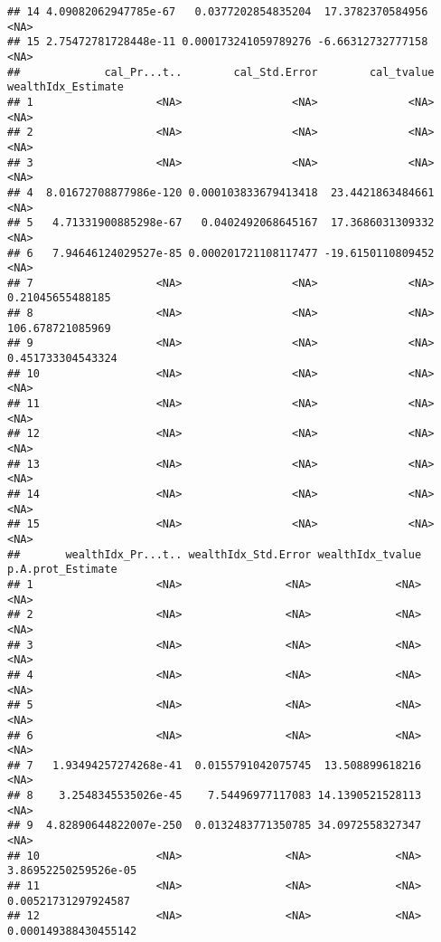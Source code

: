 \documentclass[
]{book}
\begin{document}
\begin{verbatim}
## 14 4.09082062947785e-67   0.0377202854835204  17.3782370584956                 <NA>
## 15 2.75472781728448e-11 0.000173241059789276 -6.66312732777158                 <NA>
##             cal_Pr...t..        cal_Std.Error        cal_tvalue wealthIdx_Estimate
## 1                   <NA>                 <NA>              <NA>               <NA>
## 2                   <NA>                 <NA>              <NA>               <NA>
## 3                   <NA>                 <NA>              <NA>               <NA>
## 4  8.01672708877986e-120 0.000103833679413418  23.4421863484661               <NA>
## 5   4.71331900885298e-67   0.0402492068645167  17.3686031309332               <NA>
## 6   7.94646124029527e-85 0.000201721108117477 -19.6150110809452               <NA>
## 7                   <NA>                 <NA>              <NA>   0.21045655488185
## 8                   <NA>                 <NA>              <NA>   106.678721085969
## 9                   <NA>                 <NA>              <NA>  0.451733304543324
## 10                  <NA>                 <NA>              <NA>               <NA>
## 11                  <NA>                 <NA>              <NA>               <NA>
## 12                  <NA>                 <NA>              <NA>               <NA>
## 13                  <NA>                 <NA>              <NA>               <NA>
## 14                  <NA>                 <NA>              <NA>               <NA>
## 15                  <NA>                 <NA>              <NA>               <NA>
##       wealthIdx_Pr...t.. wealthIdx_Std.Error wealthIdx_tvalue    p.A.prot_Estimate
## 1                   <NA>                <NA>             <NA>                 <NA>
## 2                   <NA>                <NA>             <NA>                 <NA>
## 3                   <NA>                <NA>             <NA>                 <NA>
## 4                   <NA>                <NA>             <NA>                 <NA>
## 5                   <NA>                <NA>             <NA>                 <NA>
## 6                   <NA>                <NA>             <NA>                 <NA>
## 7   1.93494257274268e-41  0.0155791042075745  13.508899618216                 <NA>
## 8    3.2548345535026e-45    7.54496977117083 14.1390521528113                 <NA>
## 9  4.82890644822007e-250  0.0132483771350785 34.0972558327347                 <NA>
## 10                  <NA>                <NA>             <NA> 3.86952250259526e-05
## 11                  <NA>                <NA>             <NA>  0.00521731297924587
## 12                  <NA>                <NA>             <NA> 0.000149388430455142

\end{verbatim}
\end{document}
